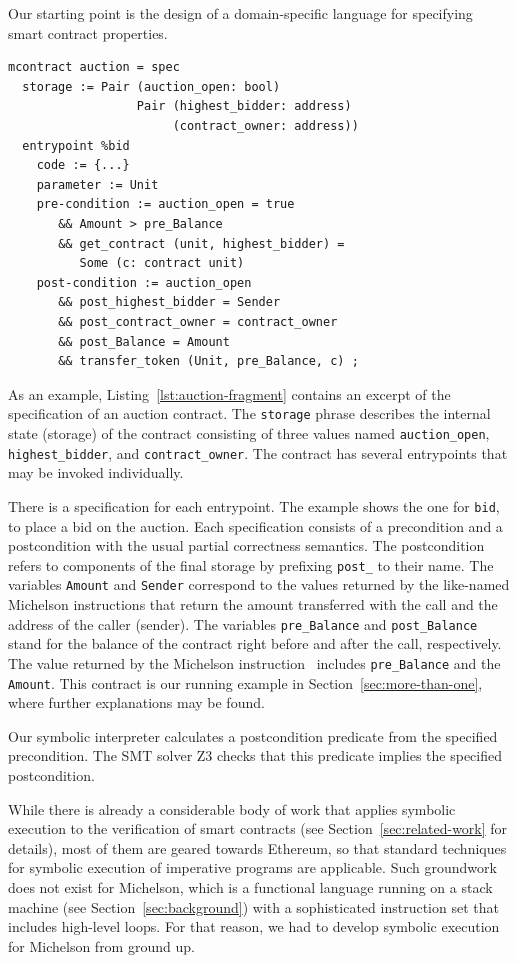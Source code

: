 \documentclass[a4paper,USenglish,cleveref, autoref,anonymous]{lipics-v2021}
\begin{document}
Our starting point is the design of a domain-specific language for
specifying smart contract properties.
\begin{lstlisting}[float=tp,captionpos=b,caption={Auction contract specification (excerpt)},label={lst:auction-fragment}]
mcontract auction = spec 
  storage := Pair (auction_open: bool) 
                  Pair (highest_bidder: address)
                       (contract_owner: address))
  entrypoint %bid
    code := {...}
    parameter := Unit 
    pre-condition := auction_open = true
       && Amount > pre_Balance 
       && get_contract (unit, highest_bidder) = 
          Some (c: contract unit)
    post-condition := auction_open
       && post_highest_bidder = Sender 
       && post_contract_owner = contract_owner 
       && post_Balance = Amount 
       && transfer_token (Unit, pre_Balance, c) ;
\end{lstlisting}
As an example, Listing~\ref{lst:auction-fragment} contains an excerpt
of the specification of an auction contract. The \texttt{storage}
phrase describes the internal state (storage) of the contract
consisting of three values named \lstinline|auction_open|,
\lstinline|highest_bidder|, and \lstinline|contract_owner|.
The contract has several entrypoints that may be invoked individually.

There is a specification for each entrypoint. The example shows the
one for  \lstinline|bid|, to place a bid on the auction. Each
specification consists of a precondition and a 
postcondition with the usual partial correctness semantics. The
postcondition refers to components of the final storage by prefixing
\lstinline|post_| to their name. The variables
\lstinline|Amount| and \lstinline|Sender| correspond to the values
returned by the like-named Michelson instructions that return the
amount transferred with the call and the address of the caller
(sender).  The variables \lstinline|pre_Balance| and
\lstinline|post_Balance| stand for the balance of the contract right
before and after the call, respectively. The value returned by the
Michelson instruction \BALANCE\ includes 
\lstinline|pre_Balance| and the \lstinline|Amount|.
This contract is our running example in
Section~\ref{sec:more-than-one}, where further explanations may be found.

Our symbolic interpreter calculates a postcondition predicate from the specified
precondition. The SMT solver Z3 \cite{z3} checks that this predicate
implies the specified postcondition.

While there is already a considerable body of work that applies
symbolic execution to the verification of smart contracts
\cite{securify, manticore,kevm,park} (see
Section~\ref{sec:related-work} for details), most of them are geared
towards Ethereum, so that standard techniques for symbolic execution
of imperative programs are applicable. Such groundwork does not exist
for Michelson, which is a functional language running on a stack
machine (see Section~\ref{sec:background}) with a sophisticated
instruction set that includes high-level loops. For that reason, we had to
develop symbolic execution for Michelson from ground up.
\end{document}
